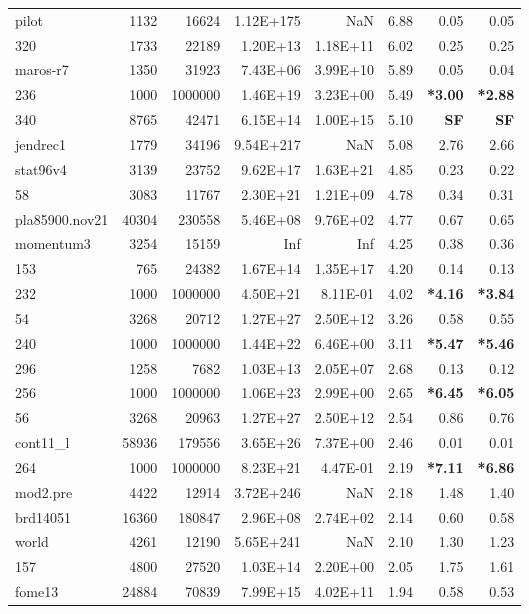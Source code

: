 \documentclass[10pt]{article}
\newcommand{\red}{
	\color{red}	
	}
\begin{document}
\begin{longtable}{|l|r|r|r|r|r|r|r|}
pilot	&	1132	&	16624	&	1.12E+175	&	NaN	&	6.88	&	0.05	&	0.05	\\
320	&	1733	&	22189	&	1.20E+13	&	1.18E+11	&	6.02	&	0.25	&	0.25	\\
maros-r7	&	1350	&	31923	&	7.43E+06	&	3.99E+10	&	5.89	&	0.05	&	0.04	\\
236	&	1000	&	1000000	&	1.46E+19	&	3.23E+00	&	5.49	&	{\bf \red *3.00}	&	{\bf \red *2.88}	\\
340	&	8765	&	42471	&	6.15E+14	&	1.00E+15	&	5.10	&	{\bf \red SF}	&	{\bf \red SF}	\\
jendrec1	&	1779	&	34196	&	9.54E+217	&	NaN	&	5.08	&	2.76	&	2.66	\\
stat96v4	&	3139	&	23752	&	9.62E+17	&	1.63E+21	&	4.85	&	0.23	&	0.22	\\
58	&	3083	&	11767	&	2.30E+21	&	1.21E+09	&	4.78	&	0.34	&	0.31	\\
pla85900.nov21	&	40304	&	230558	&	5.46E+08	&	9.76E+02	&	4.77	&	0.67	&	0.65	\\
momentum3	&	3254	&	15159	&	Inf	&	Inf	&	4.25	&	0.38	&	0.36	\\
153	&	765	&	24382	&	1.67E+14	&	1.35E+17	&	4.20	&	0.14	&	0.13	\\
232	&	1000	&	1000000	&	4.50E+21	&	8.11E-01	&	4.02	&	{\bf \red *4.16}	&	{\bf \red *3.84} 	\\
54	&	3268	&	20712	&	1.27E+27	&	2.50E+12	&	3.26	&	0.58	&	0.55	\\
240	&	1000	&	1000000	&	1.44E+22	&	6.46E+00	&	3.11	&	{\bf \red *5.47}	&	{\bf \red *5.46}	\\
296	&	1258	&	7682	&	1.03E+13	&	2.05E+07	&	2.68	&	0.13	&	0.12	\\
256	&	1000	&	1000000	&	1.06E+23	&	2.99E+00	&	2.65	&	{\bf \red *6.45}	&	{\bf \red *6.05}	\\
56	&	3268	&	20963	&	1.27E+27	&	2.50E+12	&	2.54	&	0.86	&	0.76	\\
cont11\_l	&	58936	&	179556	&	3.65E+26	&	7.37E+00	&	2.46	&	0.01	&	0.01	\\
264	&	1000	&	1000000	&	8.23E+21	&	4.47E-01	&	2.19	&	{\bf \red *7.11}	&	{\bf \red *6.86}	\\
mod2.pre	&	4422	&	12914	&	3.72E+246	&	NaN	&	2.18	&	1.48	&	1.40	\\
brd14051	&	16360	&	180847	&	2.96E+08	&	2.74E+02	&	2.14	&	0.60	&	0.58	\\
world	&	4261	&	12190	&	5.65E+241	&	NaN	&	2.10	&	1.30	&	1.23	\\
157	&	4800	&	27520	&	1.03E+14	&	2.20E+00	&	2.05	&	1.75	&	1.61	\\
fome13	&	24884	&	70839	&	7.99E+15	&	4.02E+11	&	1.94	&	0.58	&	0.53	\\

\end{longtable}
\end{document}

